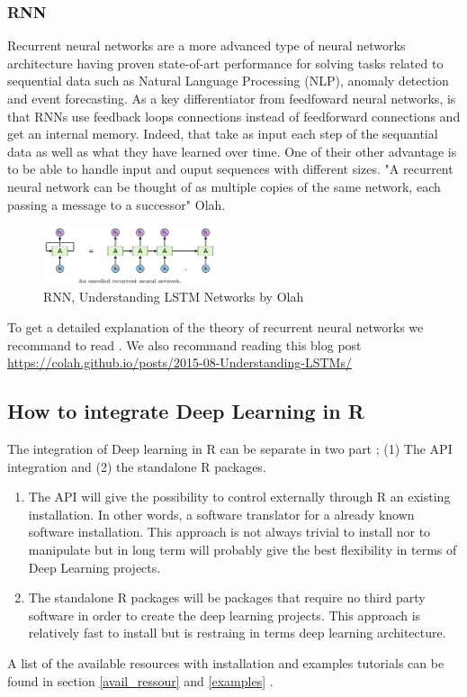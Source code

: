 \documentclass[6pt,letter]{article}\usepackage[]{graphicx}\usepackage[]{color}
\begin{document}
\subsubsection{RNN}
Recurrent neural networks are a more advanced type of neural networks architecture having proven state-of-art performance for solving tasks related to sequential data such as Natural Language Processing (NLP), anomaly detection and event forecasting. As a key differentiator from feedfoward neural networks, is that RNNs use feedback loops connections instead of feedforward connections and get an internal memory. Indeed, that take as input each step of the sequantial data as well as what they have learned over time. One of their other advantage is to be able to handle input and ouput sequences with different sizes. "A recurrent neural network can be thought of as multiple copies of the same network, each passing a message to a successor" Olah.
\begin{figure}[h]
    \centering
    \includegraphics[width=0.45\textwidth]{figure/RNN_process.png}
     \caption{RNN, Understanding LSTM Networks by Olah}
     \label{fig:rnn_process}
\end{figure}

To get a detailed explanation of the theory of recurrent neural networks we recommand to read \cite[Chapter 10]{Goodfellow-et-al-2016}. We also recommand reading this blog post \url{https://colah.github.io/posts/2015-08-Understanding-LSTMs/}

\subsection{How to integrate Deep Learning in R}
The integration of Deep learning in R can be separate in two part ; (1) The API integration and (2) the standalone R packages. 
\begin{enumerate}
\item The API will give the possibility to control externally through R an existing installation. In other words, a software translator for a already known software installation. This approach is not always trivial to install nor to manipulate but in long term will probably give the best flexibility in terms of Deep Learning projects.
\item The standalone R packages will be packages that require no third party software in order to create the deep learning projects. This approach is relatively fast to install but is restraing in terms deep learning architecture.
\end{enumerate}
A list of the available resources with installation and examples tutorials can be found in section \ref{avail_ressour} and \ref{examples} .
\end{document}
